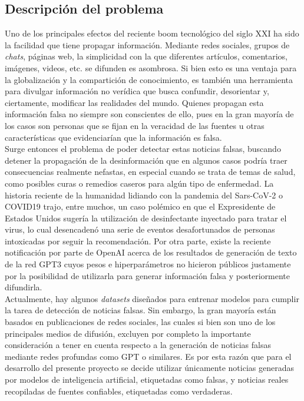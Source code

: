 \subsection{Descripción del problema}
Uno de los principales efectos del reciente boom tecnológico del siglo XXI ha sido la facilidad que tiene propagar información. Mediante redes sociales, grupos de \textit{chats}, páginas web, la simplicidad con la que diferentes artículos, comentarios, imágenes, videos, etc. se difunden es asombrosa. Si bien esto es una ventaja para la globalización y la compartición de conocimiento, es también una herramienta para divulgar información no verídica que busca confundir, desorientar y, ciertamente, modificar las realidades del mundo. Quienes propagan esta información falsa no siempre son conscientes de ello, pues en la gran mayoría de los casos son personas que se fijan en la veracidad de las fuentes u otras características que evidenciarían que la información es falsa.\\

Surge entonces el problema de poder detectar estas noticias falsas, buscando detener la propagación de la desinformación que en algunos casos podría traer consecuencias realmente nefastas, en especial cuando se trata de temas de salud, como posibles curas o remedios caseros para algún tipo de enfermedad. La historia reciente de la humanidad lidiando con la pandemia del Sars-CoV-2 o COVID19 trajo, entre muchos, un caso polémico en que el Expresidente de Estados Unidos sugería la utilización de desinfectante inyectado para tratar el virus, lo cual desencadenó una serie de eventos desafortunados de personas intoxicadas por seguir la recomendación. Por otra parte, existe la reciente notificación por parte de OpenAI acerca de los resultados de generación de texto de la red GPT3 cuyos pesos e hiperparámetros no hicieron públicos justamente por la posibilidad de utilizarla para generar información falsa y posteriormente difundirla.\\

Actualmente, hay algunos \textit{datasets} diseñados para entrenar modelos para cumplir la tarea de detección de noticias falsas. Sin embargo, la gran mayoría están basados en publicaciones de redes sociales, las cuales si bien son uno de los principales medios de difusión, excluyen por completo la importante consideración a tener en cuenta respecto a la generación de noticias falsas mediante redes profundas como GPT o similares. Es por esta razón que para el desarrollo del presente proyecto se decide utilizar únicamente noticias generadas por modelos de inteligencia artificial, etiquetadas como falsas, y noticias reales recopiladas de fuentes confiables, etiquetadas como verdaderas.\\

